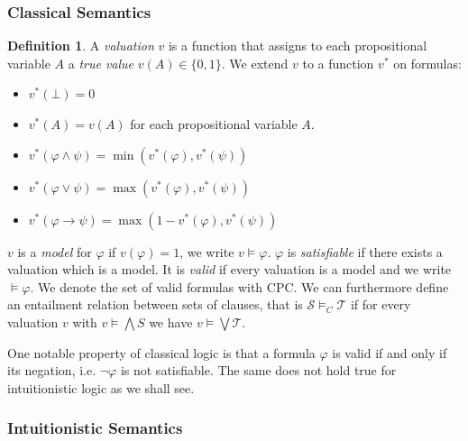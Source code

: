 \documentclass[a4paper,11pt]{report}
\theoremstyle{definition}
\theoremstyle{definition}
\theoremstyle{definition}
\theoremstyle{definition}
\theoremstyle{definition}
\newtheorem{definition}[theorem]{Definition}
\theoremstyle{definition}
\theoremstyle{definition}
\begin{document}
	\subsubsection{Classical Semantics}
	
	\begin{definition}
		A \textit{valuation} $v$ is a function that assigns to each propositional variable $A$ a \textit{true value} $v(A)\in\{0, 1\}$. We extend $v$ to a function $v^*$ on formulas:
		\begin{itemize}
			\item $v^*(\bot) = 0$
			\item $v^*(A) = v(A)$ for each propositional variable $A$.
			\item $v^*(\varphi\wedge\psi) = \min(v^*(\varphi), v^*(\psi))$
			\item $v^*(\varphi\vee\psi) = \max(v^*(\varphi), v^*(\psi))$
			\item $v^*(\varphi\to \psi) = \max(1 - v^*(\varphi), v^*(\psi))$
		\end{itemize}
		$v$ is a \textit{model} for $\varphi$ if $v(\varphi) = 1$, we write $v\models\varphi$. $\varphi$ is \textit{satisfiable} if there exists a valuation which is a model. It is \textit{valid} if every valuation is a model and we write $\models \varphi$. We denote the set of valid formulas with CPC. We can furthermore define an entailment relation between sets of clauses, that is $\mathcal S\models_C \mathcal T$ if for every valuation $v$ with $v\models\bigwedge S$ we have $v\models\bigvee \mathcal T$.
	\end{definition}
	
	One notable property of classical logic is that a formula $\varphi$ is valid if and only if its negation, i.e. $\neg\varphi$ is not satisfiable. The same does not hold true for intuitionistic logic as we shall see.

	\subsubsection{Intuitionistic Semantics}
	
\end{document}
